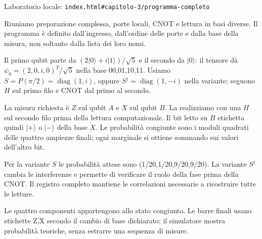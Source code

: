 {\sffamily\small\color{Ink!70} Laboratorio locale: \nolinkurl{index.html#capitolo-3/programma-completo}\par}

Riuniamo preparazione complessa, porte locali, CNOT e lettura in basi diverse. Il programma è definito dall'ingresso, dall'ordine delle porte e dalla base della misura, non soltanto dalla lista dei loro nomi.\par

Il primo qubit parte da \((2|0\rangle +i|1\rangle )/\sqrt{5}\) e il secondo da \(|0\rangle \): il tensore dà \(\psi _{0}=(2{,}0,\allowbreak i,\allowbreak 0)^{T}/\sqrt{5}\) nella base 00,01,10,11. Usiamo \(S=P(\pi /2)=\operatorname{diag}(1,\allowbreak i)\), oppure \(S{}^{\dagger} =\operatorname{diag}(1,\allowbreak - i)\) nella variante; seguono \(H\) sul primo filo e CNOT dal primo al secondo.\par

La misura richiesta è \(Z\) sul qubit \(A\) e \(X\) sul qubit \(B\). La realizziamo con una \(H\) sul secondo filo prima della lettura computazionale. Il bit letto su \(B\) etichetta quindi \(|+\rangle \) o \(|- \rangle \) della base \(X\). Le probabilità congiunte sono i moduli quadrati delle quattro ampiezze finali; ogni marginale si ottiene sommando sui valori dell'altro bit.\par

Per la variante \(S\) le probabilità attese sono (1/20,1/20,9/20,9/20). La variante \(S{}^{\dagger} \) cambia le interferenze e permette di verificare il ruolo della fase prima della CNOT. Il registro completo mantiene le correlazioni necessarie a ricostruire tutte le letture.\par



Le quattro componenti appartengono allo stato congiunto. Le barre finali usano etichette Z,X secondo il cambio di base dichiarato; il simulatore mostra probabilità teoriche, senza estrarre una sequenza di misure.\par


